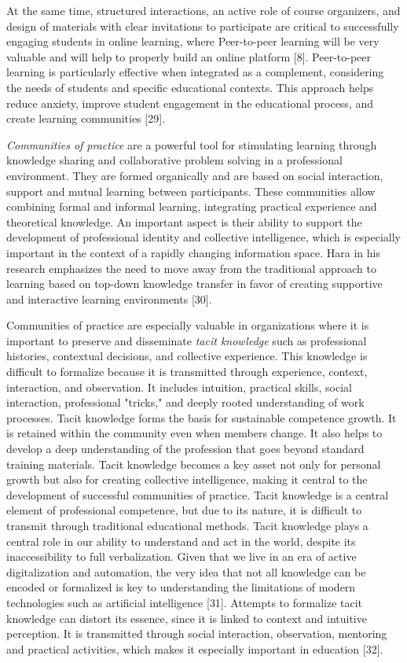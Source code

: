 \begin{multicols}{2}
At the same time, structured interactions, an active role of course
organizers, and design of materials with clear invitations to
participate are critical to successfully engaging students in online
learning, where Peer-to-peer learning will be very valuable and will
help to properly build an online platform {[}8{]}. Peer-to-peer learning
is particularly effective when integrated as a complement, considering
the needs of students and specific educational contexts. This approach
helps reduce anxiety, improve student engagement in the educational
process, and create learning communities {[}29{]}.

\emph{Communities of practice} are a powerful tool for stimulating
learning through knowledge sharing and collaborative problem solving in
a professional environment. They are formed organically and are based on
social interaction, support and mutual learning between participants.
These communities allow combining formal and informal learning,
integrating practical experience and theoretical knowledge. An important
aspect is their ability to support the development of professional
identity and collective intelligence, which is especially important in
the context of a rapidly changing information space. Hara in his
research emphasizes the need to move away from the traditional approach
to learning based on top-down knowledge transfer in favor of creating
supportive and interactive learning environments {[}30{]}.

Communities of practice are especially valuable in organizations where
it is important to preserve and disseminate \emph{tacit knowledge} such
as professional histories, contextual decisions, and collective
experience. This knowledge is difficult to formalize because it is
transmitted through experience, context, interaction, and observation.
It includes intuition, practical skills, social interaction,
professional "tricks," and deeply rooted understanding of work
processes. Tacit knowledge forms the basis for sustainable competence
growth. It is retained within the community even when members change. It
also helps to develop a deep understanding of the profession that goes
beyond standard training materials. Tacit knowledge becomes a key asset
not only for personal growth but also for creating collective
intelligence, making it central to the development of successful
communities of practice. Tacit knowledge is a central element of
professional competence, but due to its nature, it is difficult to
transmit through traditional educational methods. Tacit knowledge plays
a central role in our ability to understand and act in the world,
despite its inaccessibility to full verbalization. Given that we live in
an era of active digitalization and automation, the very idea that not
all knowledge can be encoded or formalized is key to understanding the
limitations of modern technologies such as artificial intelligence
{[}31{]}. Attempts to formalize tacit knowledge can distort its essence,
since it is linked to context and intuitive perception. It is
transmitted through social interaction, observation, mentoring and
practical activities, which makes it especially important in education
{[}32{]}.


\end{multicols}
